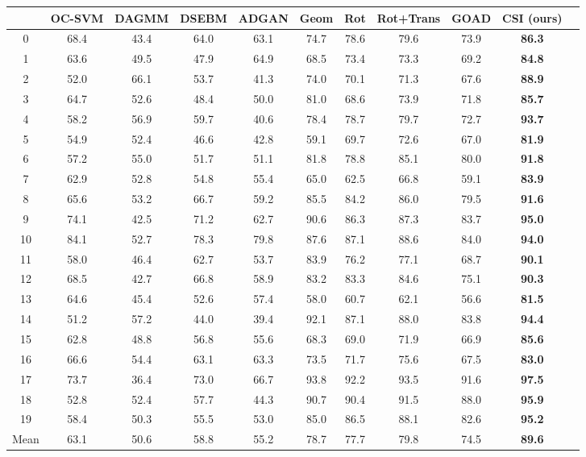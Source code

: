 \documentclass{article}
\begin{document}
\begin{table*}[h]
{\begin{tabular}{ccccccccccc}
\toprule
& OC-SVM & DAGMM & DSEBM & ADGAN & Geom & Rot & Rot+Trans & GOAD & CSI (ours) \\
\midrule
0 & 68.4 & 43.4 & 64.0 & 63.1 & 74.7 & 78.6 & 79.6 & 73.9 & \textbf{86.3} \\
1 & 63.6 & 49.5 & 47.9 & 64.9 & 68.5 & 73.4 & 73.3 & 69.2 & \textbf{84.8} \\
2 & 52.0 & 66.1 & 53.7 & 41.3 & 74.0 & 70.1 & 71.3 & 67.6 & \textbf{88.9} \\
3 & 64.7 & 52.6 & 48.4 & 50.0 & 81.0 & 68.6 & 73.9 & 71.8 & \textbf{85.7} \\
4 & 58.2 & 56.9 & 59.7 & 40.6 & 78.4 & 78.7 & 79.7 & 72.7 & \textbf{93.7} \\
5 & 54.9 & 52.4 & 46.6 & 42.8 & 59.1 & 69.7 & 72.6 & 67.0 & \textbf{81.9} \\
6 & 57.2 & 55.0 & 51.7 & 51.1 & 81.8 & 78.8 & 85.1 & 80.0 & \textbf{91.8} \\
7 & 62.9 & 52.8 & 54.8 & 55.4 & 65.0 & 62.5 & 66.8 & 59.1 & \textbf{83.9} \\
8 & 65.6 & 53.2 & 66.7 & 59.2 & 85.5 & 84.2 & 86.0 & 79.5 & \textbf{91.6} \\
9 & 74.1 & 42.5 & 71.2 & 62.7 & 90.6 & 86.3 & 87.3 & 83.7 & \textbf{95.0} \\
10 & 84.1 & 52.7 & 78.3 & 79.8 & 87.6 & 87.1 & 88.6 & 84.0 & \textbf{94.0} \\
11 & 58.0 & 46.4 & 62.7 & 53.7 & 83.9 & 76.2 & 77.1 & 68.7 & \textbf{90.1} \\
12 & 68.5 & 42.7 & 66.8 & 58.9 & 83.2 & 83.3 & 84.6 & 75.1 & \textbf{90.3} \\
13 & 64.6 & 45.4 & 52.6 & 57.4 & 58.0 & 60.7 & 62.1 & 56.6 & \textbf{81.5} \\
14 & 51.2 & 57.2 & 44.0 & 39.4 & 92.1 & 87.1 & 88.0 & 83.8 & \textbf{94.4} \\
15 & 62.8 & 48.8 & 56.8 & 55.6 & 68.3 & 69.0 & 71.9 & 66.9 & \textbf{85.6} \\
16 & 66.6 & 54.4 & 63.1 & 63.3 & 73.5 & 71.7 & 75.6 & 67.5 & \textbf{83.0} \\
17 & 73.7 & 36.4 & 73.0 & 66.7 & 93.8 & 92.2 & 93.5 & 91.6 & \textbf{97.5} \\
18 & 52.8 & 52.4 & 57.7 & 44.3 & 90.7 & 90.4 & 91.5 & 88.0 & \textbf{95.9} \\
19 & 58.4 & 50.3 & 55.5 & 53.0 & 85.0 & 86.5 & 88.1 & 82.6 & \textbf{95.2} \\
\midrule
Mean & 63.1 & 50.6 & 58.8 & 55.2 & 78.7 & 77.7 & 79.8 & 74.5 & \textbf{89.6} \\
\bottomrule
\end{tabular}}
\end{table*}
\end{document}
